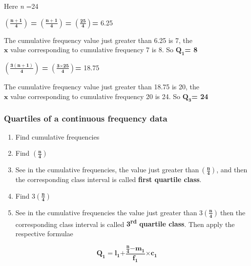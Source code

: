 \documentclass[
]{book}
\begin{document}
Here \emph{n} =24

\(\left( \frac{\mathbf{n + 1}}{\mathbf{4}} \right)\) \textbf{=}
\(\left( \frac{\mathbf{n + 1}}{\mathbf{4}} \right)\mathbf{\ }\)\textbf{=}
\(\left( \frac{\mathbf{25}}{\mathbf{4}} \right)\)\textbf{=} 6.25

The cumulative frequency value just greater than 6.25 is 7, the\\
\(\mathbf{x}\) value corresponding to cumulative frequency 7 is 8. So
\(\mathbf{Q}_{\mathbf{1}}\)\textbf{= 8}

\(\left( \frac{\mathbf{3(n + 1)}}{\mathbf{4}} \right)\) \textbf{=}
\(\left( \frac{\mathbf{3}\mathbf{\times}\mathbf{25}}{\mathbf{4}} \right)\)\textbf{=}
18.75

The cumulative frequency value just greater than 18.75 is 20, the\\
\(\mathbf{x}\) value corresponding to cumulative frequency 20 is 24. So
\(\mathbf{Q}_{\mathbf{3}}\)\textbf{= 24}

\hypertarget{quartiles-of-a-continuous-frequency-data}{%
\subsubsection{Quartiles of a continuous frequency data}\label{quartiles-of-a-continuous-frequency-data}}

\begin{enumerate}
\def\labelenumi{\arabic{enumi}.}
\item
  Find cumulative frequencies
\item
  Find \(\left( \frac{\mathbf{n}}{\mathbf{4}} \right)\)
\item
  See in the cumulative frequencies, the value just greater
  than\(\ \left( \frac{\mathbf{n}}{\mathbf{4}} \right)\), and then the
  corresponding class interval is called \textbf{first quartile class}.
\item
  Find \(3\left( \frac{\mathbf{n}}{\mathbf{4}} \right)\)
\item
  See in the cumulative frequencies the value just greater than
  \(3\left( \frac{\mathbf{n}}{\mathbf{4}} \right)\mathbf{\ }\)then the
  corresponding class interval is called \textbf{3\textsuperscript{rd} quartile class}.
  Then apply the respective formulae
\end{enumerate}

\[\mathbf{Q}_{\mathbf{1}}\mathbf{=}\mathbf{l}_{\mathbf{1}}\mathbf{+}\frac{\frac{\mathbf{n}}{\mathbf{4}}\mathbf{-}\mathbf{m}_{\mathbf{1}}}{\mathbf{f}_{\mathbf{1}}}\mathbf{\times}\mathbf{c}_{\mathbf{1}}\]
\end{document}
